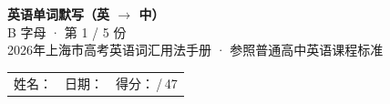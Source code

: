\documentclass[10pt,a4paper]{article}
\begin{document}
\pagestyle{plain}

\begin{center}
{\LARGE\bfseries 英语单词默写（英 $\to$ 中）}\\[0.22em]
{\large B 字母 · 第 1 / 5 份}\\[0.18em]
{\small 2026年上海市高考英语词汇用法手册 · 参照普通高中英语课程标准}
\end{center}

\vspace{0.25em}
\noindent\begin{tabular}{@{}p{}@{}p{}@{}p{}@{}}
姓名：\underline{\hspace{2.0cm}} & 日期：\underline{\hspace{2.0cm}} & 得分：\underline{\hspace{1.3cm}}\,/\,47 \\
\end{tabular}

\vspace{0.3em}

\vspace{0.08em}
\end{document}
